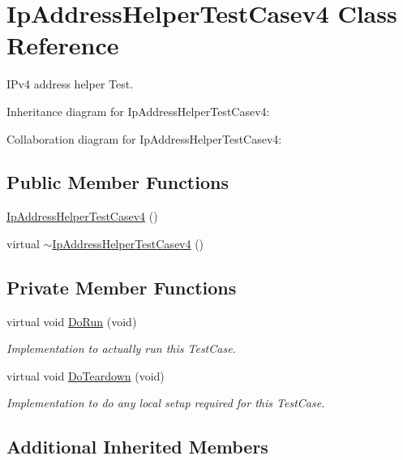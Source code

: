 \hypertarget{classIpAddressHelperTestCasev4}{}\section{Ip\+Address\+Helper\+Test\+Casev4 Class Reference}
\label{classIpAddressHelperTestCasev4}


I\+Pv4 address helper Test.  




Inheritance diagram for Ip\+Address\+Helper\+Test\+Casev4\+:


Collaboration diagram for Ip\+Address\+Helper\+Test\+Casev4\+:
\subsection*{Public Member Functions}
\begin{DoxyCompactItemize}
\item 
\hyperlink{classIpAddressHelperTestCasev4_a6d871f59a10b5c0eaed93a627df2d780}{Ip\+Address\+Helper\+Test\+Casev4} ()
\item 
virtual \hyperlink{classIpAddressHelperTestCasev4_a36d341950b8c72f368c8dd58d0085704}{$\sim$\+Ip\+Address\+Helper\+Test\+Casev4} ()
\end{DoxyCompactItemize}
\subsection*{Private Member Functions}
\begin{DoxyCompactItemize}
\item 
virtual void \hyperlink{classIpAddressHelperTestCasev4_a2f25a097e641ed35affb3c4fa85e766f}{Do\+Run} (void)
\begin{DoxyCompactList}\small\item\em Implementation to actually run this Test\+Case. \end{DoxyCompactList}\item 
virtual void \hyperlink{classIpAddressHelperTestCasev4_a4b89af9154903e73a8363629eb52f91f}{Do\+Teardown} (void)
\begin{DoxyCompactList}\small\item\em Implementation to do any local setup required for this Test\+Case. \end{DoxyCompactList}\end{DoxyCompactItemize}
\subsection*{Additional Inherited Members}


